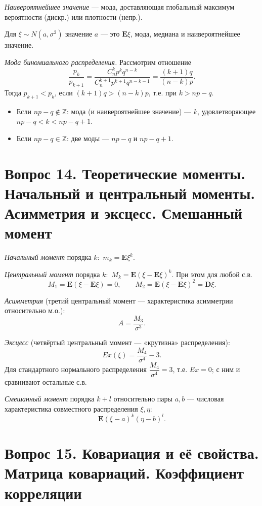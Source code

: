 \textit{Наивероятнейшее значение} — мода, доставляющая глобальный максимум вероятности (дискр.) или плотности (непр.).

Для $\xi\sim N(a,\sigma^2)$ значение $a$ — это $\mathbf{E}\xi$, мода, медиана и наивероятнейшее значение.

\textit{Мода биномиального распределения.} Рассмотрим отношение
\[ \frac{p_k}{p_{k+1}}=\frac{C_n^k p^k q^{n-k}}{C_n^{k+1}p^{k+1}q^{n-k-1}}=\frac{(k+1)q}{(n-k)p}. \]
Тогда $p_{k+1}<p_k$, если $(k+1)q>(n-k)p$, т.е. при $k>np-q$.
\begin{itemize}
  \item Если $np-q\notin\mathbb{Z}$: мода (и наивероятнейшее значение) — $k$, удовлетворяющее $np-q<k<np-q+1$.
  \item Если $np-q\in\mathbb{Z}$: две моды — $np-q$ и $np-q+1$.
\end{itemize}

\section*{Вопрос 14. Теоретические моменты. Начальный и центральный моменты. Асимметрия и эксцесс. Смешанный момент}

\textit{Начальный момент} порядка $k$:\ $m_k=\mathbf{E}\xi^k$.

\textit{Центральный момент} порядка $k$:\ $M_k=\mathbf{E}(\xi-\mathbf{E}\xi)^k$. При этом для любой с.в.
\[ M_1=\mathbf{E}(\xi-\mathbf{E}\xi)=0,\qquad M_2=\mathbf{E}(\xi-\mathbf{E}\xi)^2=\mathbf{D}\xi. \]

\textit{Асимметрия} (третий центральный момент — характеристика асимметрии относительно м.о.):
\[ A=\frac{M_3}{\sigma^3}. \]

\textit{Эксцесс} (четвёртый центральный момент — «крутизна» распределения):
\[ Ex(\xi)=\frac{M_4}{\sigma^4}-3. \]
Для стандартного нормального распределения $\dfrac{M_4}{\sigma^4}=3$, т.е. $Ex=0$; с ним и сравнивают остальные с.в.

\textit{Смешанный момент} порядка $k+l$ относительно пары $a,b$ — числовая характеристика совместного распределения $\xi,\eta$:
\[ \mathbf{E}(\xi-a)^k(\eta-b)^l. \]

\section*{Вопрос 15. Ковариация и её свойства. Матрица ковариаций. Коэффициент корреляции}

